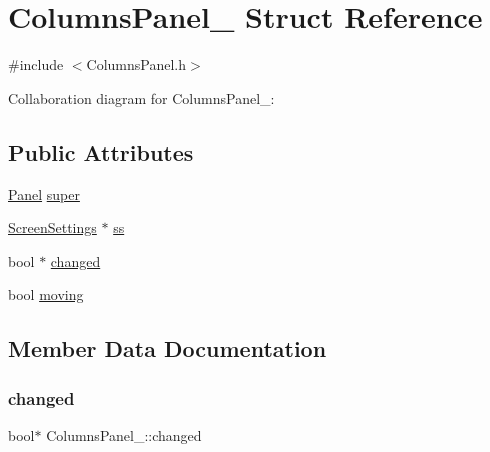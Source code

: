 \hypertarget{structColumnsPanel__}{}\section{Columns\+Panel\+\_\+ Struct Reference}
\label{structColumnsPanel__}


{\ttfamily \#include $<$Columns\+Panel.\+h$>$}



Collaboration diagram for Columns\+Panel\+\_\+\+:
\subsection*{Public Attributes}
\begin{DoxyCompactItemize}
\item 
\hyperlink{Panel_8h_a034d4c16521db412dc7a1e8536d16fae}{Panel} \hyperlink{structColumnsPanel___a80835db4cb32e37ad1125b5b5f66667d}{super}
\item 
\hyperlink{Settings_8h_a86d3dc963e563d775d50b8cc2b77afb8}{Screen\+Settings} $\ast$ \hyperlink{structColumnsPanel___a71eafb37d8e727f04ac9362feb5b4c37}{ss}
\item 
bool $\ast$ \hyperlink{structColumnsPanel___ae2c238e45a456ead5af60510916e991e}{changed}
\item 
bool \hyperlink{structColumnsPanel___a1334f9d817d41d75a562cbaa718a6a7d}{moving}
\end{DoxyCompactItemize}


\subsection{Member Data Documentation}
\mbox{\label{structColumnsPanel___ae2c238e45a456ead5af60510916e991e}} 
\subsubsection{\texorpdfstring{changed}{changed}}
{\footnotesize\ttfamily bool$\ast$ Columns\+Panel\+\_\+\+::changed}

\mbox{\label{structColumnsPanel___a1334f9d817d41d75a562cbaa718a6a7d}} 

